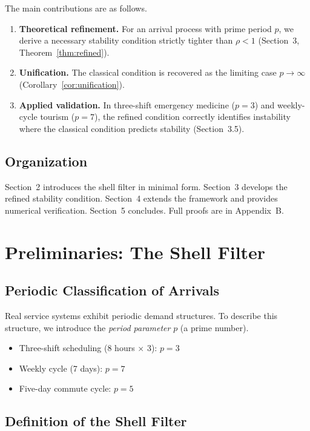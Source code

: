 \documentclass[12pt]{article}
\begin{document}
The main contributions are as follows.
\begin{enumerate}
  \item \textbf{Theoretical refinement.} For an arrival process with prime 
    period $p$, we derive a necessary stability condition strictly tighter 
    than $\rho < 1$ (Section~3, Theorem~\ref{thm:refined}).
  \item \textbf{Unification.} The classical condition is recovered as the 
    limiting case $p \to \infty$ (Corollary~\ref{cor:unification}).
  \item \textbf{Applied validation.} In three-shift emergency medicine 
    ($p=3$) and weekly-cycle tourism ($p=7$), the refined condition 
    correctly identifies instability where the classical condition 
    predicts stability (Section~3.5).
\end{enumerate}

\subsection{Organization}

Section~2 introduces the shell filter in minimal form. Section~3 
develops the refined stability condition. Section~4 extends the framework 
and provides numerical verification. Section~5 concludes. Full proofs 
are in Appendix~B.

\section{Preliminaries: The Shell Filter}

\subsection{Periodic Classification of Arrivals}

Real service systems exhibit periodic demand structures. To describe this 
structure, we introduce the \emph{period parameter} $p$ (a prime number).

\begin{itemize}
  \item Three-shift scheduling (8 hours $\times$ 3): $p = 3$
  \item Weekly cycle (7 days): $p = 7$
  \item Five-day commute cycle: $p = 5$
\end{itemize}

\subsection{Definition of the Shell Filter}
\end{document}
